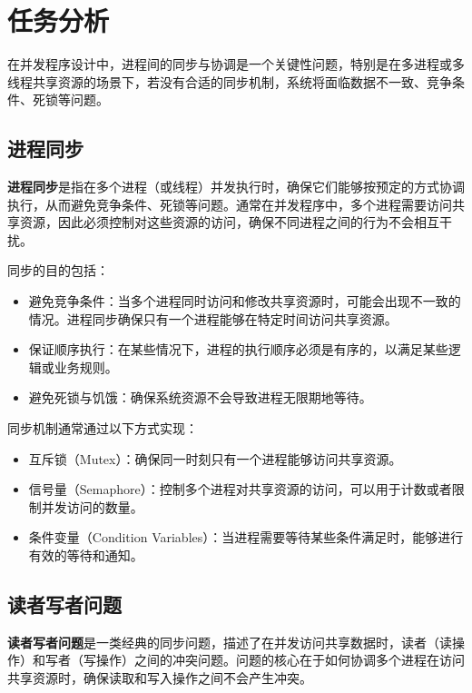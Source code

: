\maketitle

\section{任务分析}

在并发程序设计中，进程间的同步与协调是一个关键性问题，特别是在多进程或多线程共享资源的场景下，若没有合适的同步机制，系统将面临数据不一致、竞争条件、死锁等问题。

\subsection{进程同步}

\textbf{进程同步}是指在多个进程（或线程）并发执行时，确保它们能够按预定的方式协调执行，从而避免竞争条件、死锁等问题。通常在并发程序中，多个进程需要访问共享资源，因此必须控制对这些资源的访问，确保不同进程之间的行为不会相互干扰。

同步的目的包括：\begin{itemize}
    \item 避免竞争条件：当多个进程同时访问和修改共享资源时，可能会出现不一致的情况。进程同步确保只有一个进程能够在特定时间访问共享资源。
    \item 保证顺序执行：在某些情况下，进程的执行顺序必须是有序的，以满足某些逻辑或业务规则。
    \item 避免死锁与饥饿：确保系统资源不会导致进程无限期地等待。
\end{itemize}

同步机制通常通过以下方式实现：\begin{itemize}
    \item 互斥锁（Mutex）：确保同一时刻只有一个进程能够访问共享资源。
    \item 信号量（Semaphore）：控制多个进程对共享资源的访问，可以用于计数或者限制并发访问的数量。
    \item 条件变量（Condition Variables）：当进程需要等待某些条件满足时，能够进行有效的等待和通知。
\end{itemize}

\subsection{读者写者问题}

\textbf{读者写者问题}是一类经典的同步问题，描述了在并发访问共享数据时，读者（读操作）和写者（写操作）之间的冲突问题。问题的核心在于如何协调多个进程在访问共享资源时，确保读取和写入操作之间不会产生冲突。

